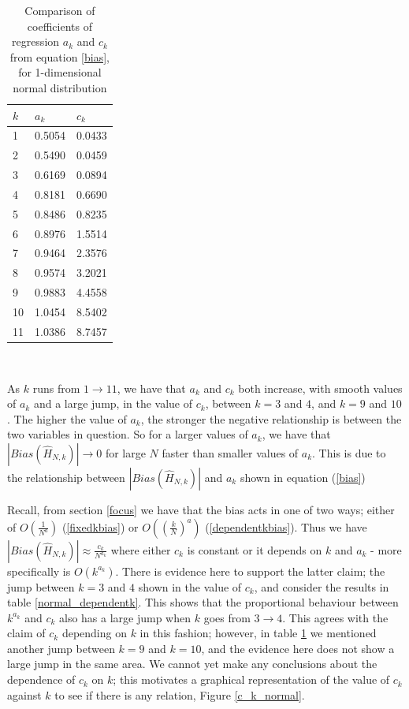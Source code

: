 \documentclass[12pt]{report}
\begin{document}
\begin{table}
\caption{Comparison of coefficients of regression $a_{k}$ and $c_{k}$ from equation \ref{bias}, for 1-dimensional normal distribution} \label{normal_a_c_compare_table}
\begin{center}
\begin{tabular}{| l | l l |} 
\toprule
$k$ &  $a_{k}$ & $c_{k}$ \\
\midrule[1pt]
1  &  0.5054 & 0.0433 \\
2  & 0.5490 & 0.0459 \\
3  & 0.6169 & 0.0894 \\
4  & 0.8181 & 0.6690 \\
5  & 0.8486 & 0.8235 \\
6  & 0.8976 & 1.5514 \\
7  & 0.9464 & 2.3576 \\
8  & 0.9574 & 3.2021 \\
9  & 0.9883 & 4.4558 \\
10 & 1.0454 & 8.5402 \\
11 & 1.0386 & 8.7457 \\
\hline
\end{tabular}
\\[10pt]
\end{center}
\end{table}

As $k$ runs from $1 \to 11$, we have that $a_{k}$ and $c_{k}$ both increase, with smooth values of $a_{k}$ and a large jump, in the value of $c_{k}$, between $k=3$ and $4$, and $k=9$ and $10$. The higher the value of $a_{k}$, the stronger the negative relationship is between the two variables in question. So for a larger values of $a_{k}$, we have that $|Bias(\hat{H}_{N, k})| \to 0$ for large $N$ faster than smaller values of $a_{k}$. This is due to the relationship between $|Bias(\hat{H}_{N, k})|$ and $a_{k}$ shown in equation (\ref{bias})

Recall, from section \ref{focus} we have that the bias acts in one of two ways; either of $O \left( \frac{1}{N^{a}} \right)$ (\ref{fixedkbias}) or $O\left( \left( \frac{k}{N} \right)^{a} \right)$ (\ref{dependentkbias}). Thus we have $|Bias(\hat{H}_{N, k})|\approx \frac{c_{k}}{N^{a_{k}}}$ where either $c_{k}$ is constant or it depends on $k$ and $a_{k}$ - more specifically is $O( k^{a_{k}})$. There is evidence here to support the latter claim; the jump between $k=3$ and $4$ shown in the value of $c_{k}$, and consider the results in table \ref{normal_dependentk}. This shows that the proportional behaviour between $k^{a_{k}}$ and $c_{k}$ also has a large jump when $k$ goes from $3 \to 4$. This agrees with the claim of $c_{k}$ depending on $k$ in this fashion; however, in table \ref{normal_a_c_compare_table} we mentioned another jump between $k=9$ and $k=10$, and the evidence here does not show a large jump in the same area. We cannot yet make any conclusions about the dependence of $c_{k}$ on $k$; this motivates a graphical representation of the value of $c_{k}$ against $k$ to see if there is any relation, Figure \ref{c_k_normal}.
\end{document}
